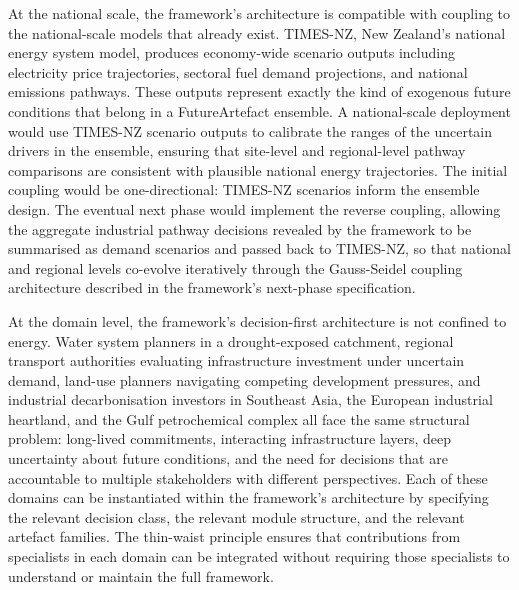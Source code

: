 \documentclass[
  11pt,
  a4paper,
  twoside,
  openright]{scrbook}
\begin{document}
At the national scale, the framework's architecture is compatible with
coupling to the national-scale models that already exist. TIMES-NZ, New
Zealand's national energy system model, produces economy-wide scenario
outputs including electricity price trajectories, sectoral fuel demand
projections, and national emissions pathways. These outputs represent
exactly the kind of exogenous future conditions that belong in a
FutureArtefact ensemble. A national-scale deployment would use TIMES-NZ
scenario outputs to calibrate the ranges of the uncertain drivers in the
ensemble, ensuring that site-level and regional-level pathway
comparisons are consistent with plausible national energy trajectories.
The initial coupling would be one-directional: TIMES-NZ scenarios inform
the ensemble design. The eventual next phase would implement the reverse
coupling, allowing the aggregate industrial pathway decisions revealed
by the framework to be summarised as demand scenarios and passed back to
TIMES-NZ, so that national and regional levels co-evolve iteratively
through the Gauss-Seidel coupling architecture described in the
framework's next-phase specification.

At the domain level, the framework's decision-first architecture is not
confined to energy. Water system planners in a drought-exposed
catchment, regional transport authorities evaluating infrastructure
investment under uncertain demand, land-use planners navigating
competing development pressures, and industrial decarbonisation
investors in Southeast Asia, the European industrial heartland, and the
Gulf petrochemical complex all face the same structural problem:
long-lived commitments, interacting infrastructure layers, deep
uncertainty about future conditions, and the need for decisions that are
accountable to multiple stakeholders with different perspectives. Each
of these domains can be instantiated within the framework's architecture
by specifying the relevant decision class, the relevant module
structure, and the relevant artefact families. The thin-waist principle
ensures that contributions from specialists in each domain can be
integrated without requiring those specialists to understand or maintain
the full framework.
\end{document}
